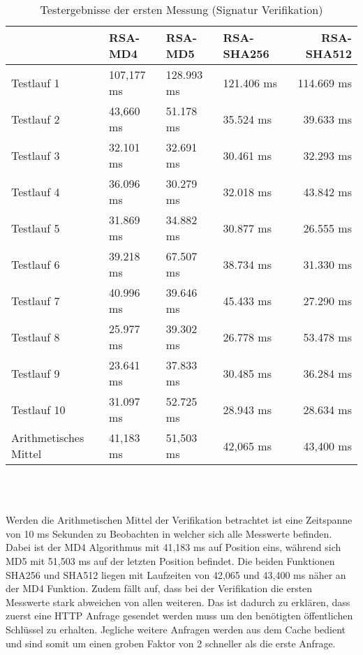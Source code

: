 \begin{table}[h]
	\begin{tabularx}{\textwidth}{p{}|X|X|X|r}
		& RSA-MD4 & RSA-MD5 & RSA-SHA256 & RSA-SHA512\\
		\hline
		Testlauf 1& 107,177 ms& 128.993 ms& 121.406 ms& 114.669 ms\\
		Testlauf 2& 43,660 ms& 51.178 ms& 35.524 ms& 39.633 ms\\
		Testlauf 3& 32.101 ms& 32.691 ms& 30.461 ms& 32.293 ms\\
		Testlauf 4& 36.096 ms& 30.279 ms& 32.018 ms& 43.842 ms\\
		Testlauf 5& 31.869 ms& 34.882 ms& 30.877 ms& 26.555 ms\\
		Testlauf 6& 39.218 ms& 67.507 ms& 38.734 ms& 31.330 ms\\
		Testlauf 7& 40.996 ms& 39.646 ms& 45.433 ms& 27.290 ms\\
		Testlauf 8& 25.977 ms& 39.302 ms& 26.778 ms& 53.478 ms\\
		Testlauf 9& 23.641 ms& 37.833 ms& 30.485 ms& 36.284 ms\\
		Testlauf 10& 31.097 ms& 52.725 ms& 28.943 ms& 28.634 ms\\
		\hline
		Arithmetisches Mittel& 41,183 ms& 51,503 ms& 42,065 ms& 43,400 ms\\
	\end{tabularx}\\	
	\caption{Testergebnisse der ersten Messung (Signatur Verifikation)}
\end{table}\\
Werden die Arithmetischen Mittel der Verifikation betrachtet ist eine Zeitspanne von 10 ms Sekunden zu Beobachten in welcher sich alle Messwerte befinden. Dabei ist der MD4 Algorithmus mit 41,183 ms auf Position eins, während sich MD5 mit 51,503 ms auf der letzten Position befindet. Die beiden Funktionen SHA256 und SHA512 liegen mit Laufzeiten von 42,065 und 43,400 ms näher an der MD4 Funktion. Zudem fällt auf, dass bei der Verifikation die ersten Messwerte stark abweichen von allen weiteren. Das ist dadurch zu erklären, dass zuerst eine HTTP Anfrage gesendet werden muss um den benötigten öffentlichen Schlüssel zu erhalten. Jegliche weitere Anfragen werden aus dem Cache bedient und sind somit um einen groben Faktor von 2 schneller als die erste Anfrage.\\
